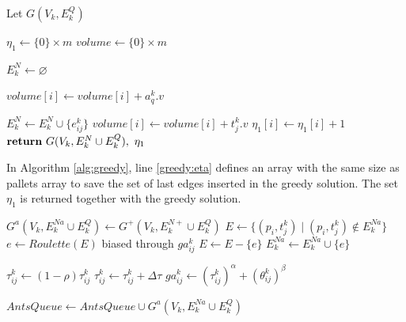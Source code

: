 \documentclass[preprint,authoryear]{elsarticle}
\begin{document}
\begin{algorithm}[H]
	\caption{ $Greedy(k, G, limit)$}  \label{alg:greedy}
	
	\begin{algorithmic}[1]
		\State Let $G(V_k, E^Q_k)$
		
		\State $\eta_1 \gets \{0\} \times m$ \label{greedy:eta}
		\State $volume \gets \{0\} \times m$
		
		\State $E^N_k \gets \varnothing$ 			
		
				\State $volume[i] \gets volume[i] + a_q^k.v$ 
			\EndIf		
		\EndFor
			
				\State $E^N_k \gets E^N_k \cup \{e_{ij}^k\}$ 
				\State $volume[i] \gets volume[i] + t_j^k.v$
				\State $\eta_1[i] \gets \eta_1[i] + 1$ 	
			\EndIf
		\EndFor
		\State ${\bf return}\ G(V_k, E^N_k \cup E^Q_k),\ \eta_1$
		
	\end{algorithmic}
\end{algorithm}

In Algorithm \ref{alg:greedy}, line \ref{greedy:eta} defines an array with the same size as pallets array to save the set of last edges inserted in the greedy solution. The set $\eta_1$ is returned together with the greedy solution.


\begin{algorithm}[H] 
	\caption{ $AntSolve(G^+,\ AntsQueue,\ ga^k_{ij})$ } \label{alg:AntSolve}
	\begin{algorithmic}[1]
		\State $G^a(V_k, E^{Na}_k \cup E^Q_k) \gets G^+(V_k, E^{N+}_k \cup E^Q_k)$
		\State $E \gets \{ (p_i,t^k_j) \mid (p_i,t^k_j) \not\in E^{Na}_k \}$ \label{AntSolve:neighborhood}
		 \label{AntSolve:not_empty}
			\State $e \gets Roulette(E)$ biased through $ga^k_{ij}$  \label{AntSolve:roulette}
			\State $E \gets E - \{e\}$		
				\State $ E^{Na}_k \gets E^{Na}_k \cup \{e\} $ \label{AntSolve:ant}
			\EndIf	
		\EndWhile
		
\State $\tau^k_{ij} \gets (1-\rho)\tau^k_{ij}$ \label{AntSolve:rho}
\State $\tau^k_{ij} \gets \tau^k_{ij} + \Delta\tau$ \label{AntSolve:phero}
\State $ga^k_{ij} \gets (\tau^k_{ij})^\alpha + (\theta^k_{ij})^\beta$ \label{AntSolve:ga}		
		
		\State $AntsQueue \gets AntsQueue \cup G^a(V_k, E^{Na}_k \cup E^Q_k)$ \label{AntSolve:put_in_queue}
	\end{algorithmic}
\end{algorithm}
\end{document}
